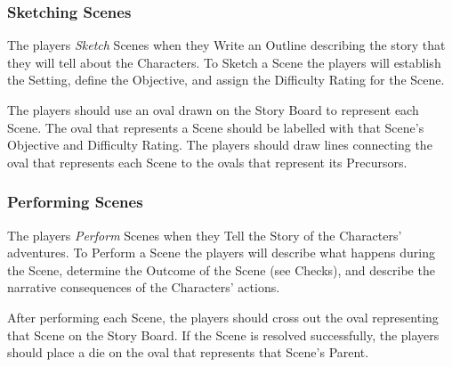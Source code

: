 \documentclass[12pt, a5paper, parskip=half-]{scrartcl}
\begin{document}
\subsubsection*{Sketching Scenes}
The players \emph{Sketch} Scenes when they Write an Outline describing the story that they will tell about the Characters. To Sketch a Scene the players will establish the Setting, define the Objective, and assign the Difficulty Rating for the Scene.

The players should use an oval drawn on the Story Board to represent each Scene. The oval that represents a Scene should be labelled with that Scene's Objective and Difficulty Rating.  The players should draw lines connecting the oval that represents each Scene to the ovals that represent its Precursors.


\subsubsection*{Performing Scenes}
The players \emph{Perform} Scenes when they Tell the Story of the Characters' adventures.
To Perform a Scene the players will describe what happens during the Scene, determine the Outcome of the Scene (see Checks), and describe the narrative consequences of the Characters' actions.

After performing each Scene, the players should cross out the oval representing that Scene on the Story Board. If the Scene is resolved successfully, the players should place a die on the oval that represents that Scene's Parent.
\newpage
\end{document}
